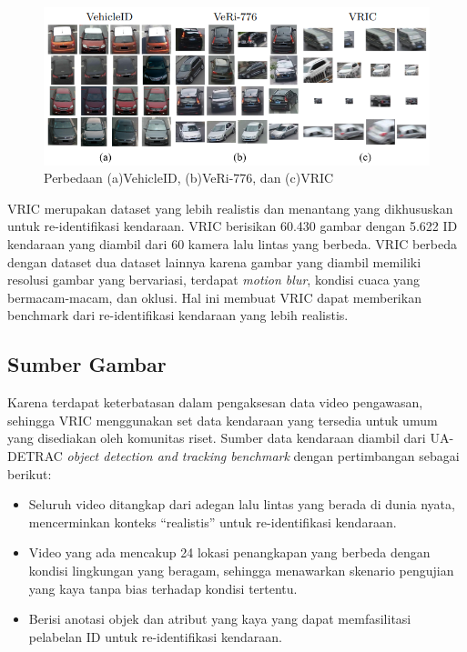 \begin{figure}[ht]
  \centering
  \includegraphics[scale=0.9]{gambar/Perbedaan VRIC dkk.png}
  \caption{Perbedaan (a)VehicleID, (b)VeRi-776, dan (c)VRIC}
  \label{fig:perbedaanvehicleidveri776danvric}
\end{figure}

VRIC merupakan dataset yang lebih realistis dan menantang yang dikhususkan untuk re-identifikasi kendaraan. VRIC berisikan 60.430 gambar dengan 5.622 ID kendaraan yang diambil dari 60 
kamera lalu lintas yang berbeda. VRIC berbeda dengan dataset dua dataset lainnya karena gambar yang diambil memiliki resolusi gambar yang bervariasi, terdapat \emph{motion blur}, kondisi 
cuaca yang bermacam-macam, dan oklusi. Hal ini membuat VRIC dapat memberikan benchmark dari re-identifikasi kendaraan yang lebih realistis. \parencite{Kanaci2018}

\subsection{Sumber Gambar}

Karena terdapat keterbatasan dalam pengaksesan data video pengawasan, sehingga VRIC menggunakan set data kendaraan yang tersedia untuk umum yang disediakan oleh komunitas riset. Sumber 
data kendaraan diambil dari UA-DETRAC \emph{object detection and tracking benchmark} dengan pertimbangan sebagai berikut:

\begin{itemize}[nolistsep]

  \item Seluruh video ditangkap dari adegan lalu lintas yang berada di dunia nyata, mencerminkan konteks “realistis” untuk re-identifikasi kendaraan.

  \item Video yang ada mencakup 24 lokasi penangkapan yang berbeda dengan kondisi lingkungan yang beragam, sehingga menawarkan skenario pengujian yang kaya tanpa bias terhadap kondisi 
  tertentu. 

  \item Berisi anotasi objek dan atribut yang kaya yang dapat memfasilitasi pelabelan ID untuk re-identifikasi kendaraan.

\end{itemize}

